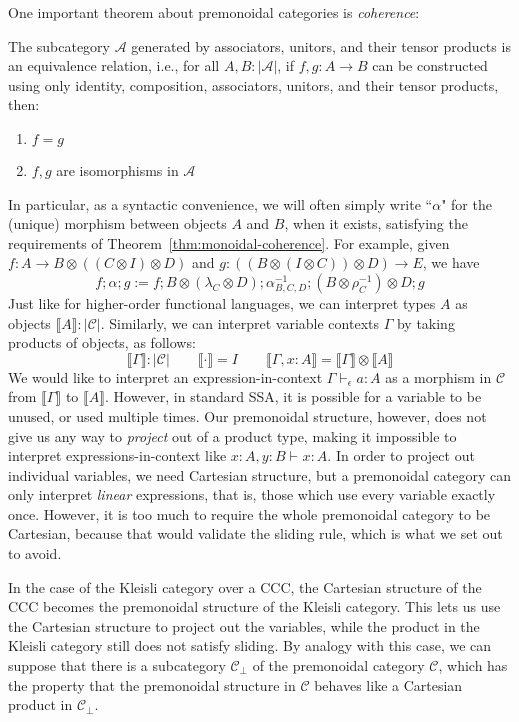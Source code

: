 \documentclass[acmsmall,screen,review]{acmart}
\newcommand{\mc}[1]{\ensuremath{\mathcal{#1}}}
\newcommand{\bhyp}[2]{#1 : #2}
\newcommand{\hasty}[4]{#1 \vdash_{#2} #3: {#4}}
\newcommand{\dnt}[1]{\llbracket{#1}\rrbracket}
\begin{document}
One important theorem about premonoidal categories is \emph{coherence}:
\begin{theorem}
  The subcategory $\mc{A}$ generated by associators, unitors, and their tensor products is an
  equivalence relation, i.e., for all $A, B : |\mc{A}|$, if
  $f, g : A \to B$ can be constructed using only identity, composition, associators, unitors, and
  their tensor products, then:
  \begin{enumerate}[label=(\alph*)]
    \item $f = g$
    \item $f, g$ are isomorphisms in $\mc{A}$
  \end{enumerate}
  \label{thm:monoidal-coherence}
\end{theorem}
In particular, as a syntactic convenience, we will often simply write ``$\alpha$" for the (unique)
morphism between objects $A$ and $B$, when it exists, satisfying the requirements of
Theorem~\ref{thm:monoidal-coherence}. For example, given $f : A \to B \otimes ((C \otimes I)
\otimes D)$ and $g : ((B \otimes (I \otimes C)) \otimes D) \to E$, we have
$$
f;\alpha;g := 
  f ; 
  B \otimes (\lambda_C \otimes D) ; 
  \alpha_{B, C, D}^{-1} ; 
  (B \otimes \rho_C^{-1}) \otimes D ;
  g 
$$
Just like for higher-order functional languages, we can interpret types $A$ as objects $\dnt{A} :
|\mc{C}|$. Similarly, we can interpret variable contexts $\Gamma$ by taking products of objects, as
follows:
$$
\boxed{\dnt{\Gamma} : |\mc{C}|} \qquad 
  \dnt{\cdot} = I \qquad \dnt{\Gamma, \bhyp{x}{A}} = \dnt{\Gamma} \otimes \dnt{A}
$$
We would like to interpret an expression-in-context $\hasty{\Gamma}{\epsilon}{a}{A}$ as a morphism in
$\mc{C}$ from $\dnt{\Gamma}$ to $\dnt{A}$. However, in standard SSA, it is possible for a variable
to be unused, or used multiple times. Our premonoidal structure, however, does not give us any way
to \emph{project} out of a product type, making it impossible to interpret expressions-in-context
like
$
\hasty{\bhyp{x}{A}, \bhyp{y}{B}}{}{x}{A}
$. 
In order to project out individual variables, we need Cartesian structure, but a premonoidal
category can only interpret \emph{linear} expressions, that is, those which use every variable
exactly once. However, it is too much to require the whole premonoidal category to be Cartesian,
because that would validate the sliding rule, which is what we set out to avoid.

In the case of the Kleisli category over a CCC, the Cartesian structure of the CCC becomes the
premonoidal structure of the Kleisli category. This lets us use the Cartesian structure to project
out the variables, while the product in the Kleisli category still does not satisfy sliding. By
analogy with this case, we can suppose that there is a subcategory $\mc{C}_\bot$ of the premonoidal
category $\mc{C}$, which has the property that the premonoidal structure in $\mc{C}$ behaves like a
Cartesian product in $\mc{C}_\bot$. 
\end{document}
